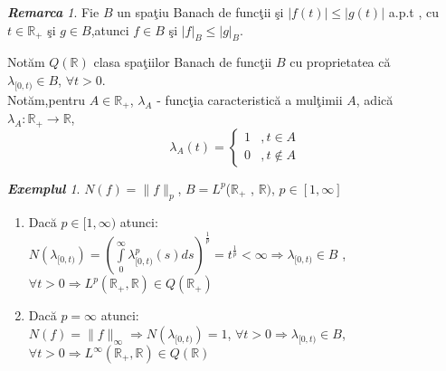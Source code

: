 \documentclass[ a4paper, 12pt]{report}
\theoremstyle{remark}
\newtheorem{remarc}{\bf Remarca}[section]
\newtheorem{exemple}{\bf Exemplul}[section]
\numberwithin{equation}{section}
\begin{document}
\begin{remarc}
Fie $B$ un spa\c tiu Banach de func\c tii \c si $\lvert f(t)\rvert \leqslant \lvert g(t)\rvert$ a.p.t , cu $t \in \mathbb{R}_+$ \c si $g \in B$,atunci $f \in B$ \c si $\vert f \rvert_B \leqslant \lvert g \rvert_B$.
\end{remarc}
Not\u am $Q(\mathbb{R})$ clasa spa\c tiilor Banach de func\c tii $B$ cu proprietatea c\u a\\ $\lambda_{[0,t)} \in B$, $ \forall t>0$.\\
Not\u am,pentru $ A \in \mathbb{R}_+ $, $\lambda_A$ - func\c tia caracteristic\u a a mul\c timii $A$, adic\u a\\ $ \lambda_A : \mathbb{R}_+ \rightarrow \mathbb{R}$,
\begin{equation*}
\lambda_A (t)=
\begin{cases}
1 &, t \in A \\
0 &, t \notin A
\end{cases}
\end{equation*}
\begin{exemple}
$ N(f) = \lVert f \rVert_p$, $B = L^p$($\mathbb{R}_+$ , $\mathbb{R})$, $p \in [1,\infty]$ \\
\begin{enumerate}
\item Dac\u a $ p \in [1,\infty)$ atunci:\\
$N(\lambda_{[0,t)})=(\int\limits_{0}^{\infty} \lambda_{[0,t)}^p (s)  ds)^ \frac{1}{p} = t^\frac{1}{p}<\infty \Rightarrow \lambda_{[0,t)}\in B$ , $\forall t>0 \Rightarrow L^p (\mathbb{R}_+,\mathbb{R}) \in Q(\mathbb{R}_+)$\\
\item Dac\u a $p = \infty $ atunci:\\
$N(f) = \lVert f \rVert_{\infty} \Rightarrow N(\lambda_{[0,t)}) = 1$, $\forall t> 0 \Rightarrow \lambda_{[0,t)} \in B$, $\forall t>0 \Rightarrow L^{\infty}(\mathbb{R}_+ , \mathbb{R}) \in Q(\mathbb{R})$ \\
\end{enumerate}
\end{exemple}
\end{document}
